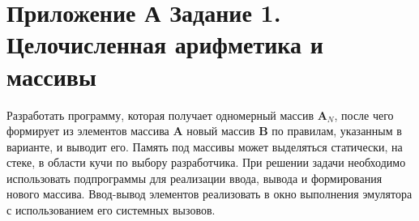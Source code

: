 \chapter*{Приложение А Задание 1. Целочисленная арифметика и массивы}

Разработать программу, которая получает одномерный массив \textbf{A$_N$}, после чего формирует из элементов массива \textbf{A} новый массив \textbf{B} по правилам, указанным в варианте, и выводит его. Память под массивы может выделяться статически, на стеке, в области кучи по выбору разработчика. При решении задачи необходимо использовать подпрограммы для реализации ввода, вывода и формирования нового массива. Ввод-вывод элементов реализовать в окно выполнения эмулятора с использованием его системных вызовов.

